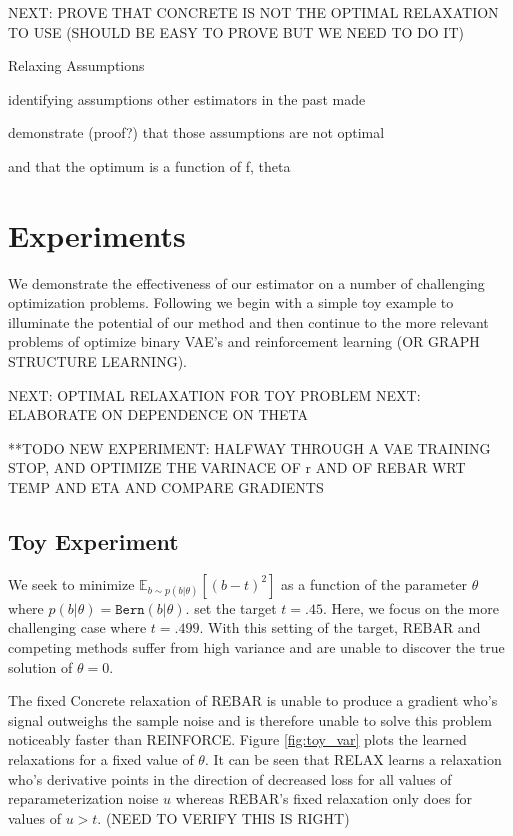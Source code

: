 \documentclass{article}
\newcommand{\relaxed}{r}
\begin{document}
NEXT: PROVE THAT CONCRETE IS NOT THE OPTIMAL RELAXATION TO USE (SHOULD BE EASY TO PROVE BUT WE NEED TO DO IT)



Relaxing Assumptions

identifying assumptions other estimators in the past made

demonstrate (proof?) that those assumptions are not optimal

and that the optimum is a function of {f, theta}



\section{Experiments}
We demonstrate the effectiveness of our estimator on a number of challenging optimization problems. Following \cite{tucker2017rebar} we begin with a simple toy example to illuminate the potential of our method and then continue to the more relevant problems of optimize binary VAE's and reinforcement learning (OR GRAPH STRUCTURE LEARNING).


NEXT: OPTIMAL RELAXATION FOR TOY PROBLEM
NEXT: ELABORATE ON DEPENDENCE ON THETA


**TODO NEW EXPERIMENT: HALFWAY THROUGH A VAE TRAINING STOP, AND OPTIMIZE THE VARINACE OF \relaxed{} AND OF REBAR WRT TEMP AND ETA AND COMPARE GRADIENTS

\subsection{Toy Experiment}
We seek to minimize $\mathbb{E}_{b \sim p(b|\theta)}[(b - t)^2]$ as a function of the parameter $\theta$ where $p(b|\theta) = \mathtt{Bern}(b|\theta)$. \cite{tucker2017rebar} set the target $t = .45$. Here, we focus on the more challenging case where $t = .499$. With this setting of the target, REBAR and competing methods suffer from high variance and are unable to discover the true solution of $\theta = 0$.

The fixed Concrete relaxation of REBAR is unable to produce a gradient who's signal outweighs the sample noise and is therefore unable to solve this problem noticeably faster than REINFORCE. Figure \ref{fig:toy_var} plots the learned relaxations for a fixed value of $\theta$. It can be seen that RELAX learns a relaxation who's derivative points in the direction of decreased loss for all values of reparameterization noise $u$ whereas REBAR's fixed relaxation  only does for values of $u > t$. (NEED TO VERIFY THIS IS RIGHT)
\end{document}
